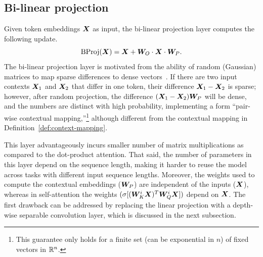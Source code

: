 \subsection{Bi-linear projection}
\vspace*{-3pt}
\label{sec:bi-linear}
Given token embeddings ${\bm{X}}$ as input, the bi-linear projection layer computes the following update.
\begin{equation*}
    {\rm BProj}({\bm{X}}) = {\bm{X}} + {\bm{W}}_O \cdot {\bm{X}} \cdot {\bm{W}}_P.
\end{equation*}
The bi-linear projection layer \citep{gong2013learning} is motivated from the ability of random (Gaussian) matrices to map sparse differences to dense vectors~\citep{ailon2009fast}. If there are two input contexts ${\bm{X}}_1$ and ${\bm{X}}_2$ that differ in one token, their difference ${\bm{X}}_1-{\bm{X}}_2$ is sparse; however, after random projection, the difference $({\bm{X}}_1-{\bm{X}}_2){\bm{W}}_P$ will be dense, and the numbers are distinct with high probability, implementing a form ``pair-wise contextual mapping,''\footnote{This guarantee only holds for a finite set (can be exponential in $n$) of fixed vectors in $\mathbb{R}^n$.} although different from the contextual mapping in Definition~\ref{def:context-mapping}.


This layer advantageously incurs smaller number of matrix multiplications as compared to the dot-product attention. That said, the number of parameters in this layer depend on the sequence length, making it harder to reuse the model across tasks with different input sequence lengths. Moreover, the weights used to compute the contextual embeddings (${\bm{W}}_P$) are independent of the inputs (${\bm{X}}$), whereas in self-attention the weights $(\sigma [({\bm{W}}_K^i {\bm{X}})^T {\bm{W}}_Q^i {\bm{X}}])$ depend on ${\bm{X}}$. The first drawback can be addressed by replacing the linear projection with a depth-wise separable convolution layer, which is discussed in the next subsection.

\vspace*{-2pt}
